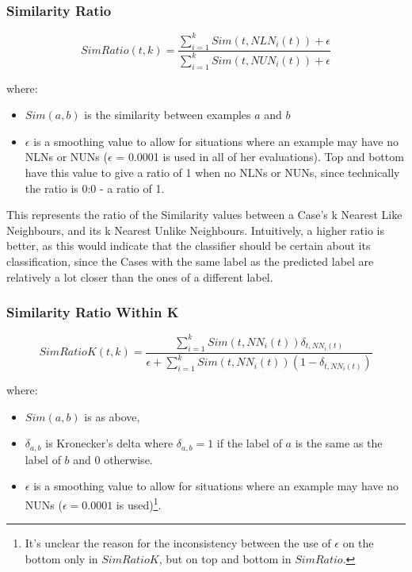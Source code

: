 \documentclass[a4paper,11pt]{report}
\begin{document}
\begin{samepage}

\subsubsection{Similarity Ratio}
\[
SimRatio(t,k)=\frac{\sum_{i=1}^{k}Sim(t,NLN_{i}(t))+\epsilon}{\sum_{i=1}^{k}Sim(t,NUN_{i}(t))+\epsilon}
\]

where:
\begin{itemize}
	\item $Sim(a, b)$ is the similarity between examples $a$ and $b$ 
	\item $\epsilon$ is a smoothing value to allow for situations where an example may have no NLNs or NUNs ($\epsilon$ = 0.0001 is used in all of her evaluations). Top and bottom have this value to give a ratio of 1 when no NLNs or NUNs, since technically the ratio is 0:0 - a ratio of 1.
\end{itemize}

This represents the ratio of the Similarity values between a Case's k Nearest Like Neighbours, and its k Nearest Unlike Neighbours. Intuitively, a higher ratio is better, as this would indicate that the classifier should be certain about its classification, since the Cases with the same label as the predicted label are relatively a lot closer than the ones of a different label.

\end{samepage}

\subsubsection{Similarity Ratio Within K}
\[
SimRatioK(t,k)=\frac{\sum_{i=1}^{k}Sim(t,NN_{i}(t))\delta_{t,NN_{i}(t)}}{\epsilon+\sum_{i=1}^{k}Sim(t,NN_{i}(t))(1-\delta_{t,NN_{i}(t)})}
\]

where:
\begin{itemize}
	\item $Sim(a, b)$ is as above, 
	\item $\delta_{a, b}$ is Kronecker's delta where $\delta_{a, b}=1$ if the label of $a$ is the same as the label of $b$ and $0$ otherwise. 
	\item $\epsilon$ is a smoothing value to allow for situations where an example may have no NUNs ($\epsilon = 0.0001$ is used)\footnote{It's unclear the reason for the inconsistency between the use of $\epsilon$ on the bottom only in $SimRatioK$, but on top and bottom in $SimRatio$.}.
\end{itemize}
\end{document}
